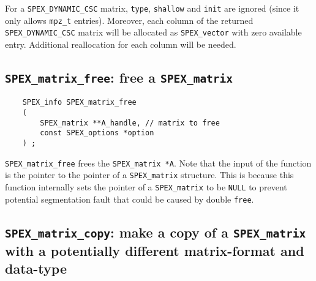 \documentclass[12pt]{report}
\theoremstyle{definition}
\begin{document}
For a \verb|SPEX_DYNAMIC_CSC| matrix, \verb|type|, \verb|shallow| and \verb|init| are ignored (since it only allows \verb|mpz_t| entries). Moreover, each column of the returned  \verb|SPEX_DYNAMIC_CSC| matrix will be
allocated as \verb|SPEX_vector| with zero available entry. Additional reallocation
for each column will be needed.


\subsection{\texttt{SPEX\_matrix\_free}: free a \texttt{SPEX\_matrix}}
\label{s:user:matrix_free}

\begin{mdframed}[userdefinedwidth=6in]
{\footnotesize
\begin{verbatim}
    SPEX_info SPEX_matrix_free
    (
        SPEX_matrix **A_handle, // matrix to free
        const SPEX_options *option
    ) ;
\end{verbatim}
} \end{mdframed}

\verb|SPEX_matrix_free| frees the \verb|SPEX_matrix *A|.  Note that the input
of the function is the pointer to the pointer of a \verb|SPEX_matrix|
structure. This is because this function internally sets the pointer of a
\verb|SPEX_matrix| to be \verb|NULL| to prevent potential segmentation fault
that could be caused by double \verb|free|.

\subsection{\texttt{SPEX\_matrix\_copy}: make a copy of a \texttt{SPEX\_matrix} with a potentially different matrix-format and data-type}
\label{s:user:matrix_copy}
\end{document}
